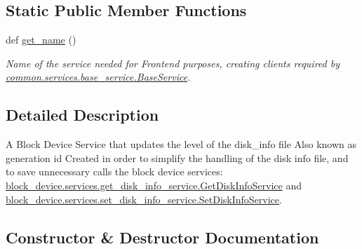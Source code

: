 \subsection*{Static Public Member Functions}
\begin{DoxyCompactItemize}
\item 
def \hyperlink{class_r_a_i_d5_1_1block__device_1_1services_1_1update__level__service_1_1_update_level_service_a3b15a64a007c7091c62be54243ddf44a}{get\+\_\+name} ()
\begin{DoxyCompactList}\small\item\em Name of the service needed for Frontend purposes, creating clients required by \hyperlink{class_r_a_i_d5_1_1common_1_1services_1_1base__service_1_1_base_service}{common.\+services.\+base\+\_\+service.\+Base\+Service}. \end{DoxyCompactList}\end{DoxyCompactItemize}


\subsection{Detailed Description}
A Block Device Service that updates the level of the disk\+\_\+info file Also known as generation id Created in order to simplify the handling of the disk info file, and to save unnecessary calls the block device services\+: \hyperlink{class_r_a_i_d5_1_1block__device_1_1services_1_1get__disk__info__service_1_1_get_disk_info_service}{block\+\_\+device.\+services.\+get\+\_\+disk\+\_\+info\+\_\+service.\+Get\+Disk\+Info\+Service} and \hyperlink{class_r_a_i_d5_1_1block__device_1_1services_1_1set__disk__info__service_1_1_set_disk_info_service}{block\+\_\+device.\+services.\+set\+\_\+disk\+\_\+info\+\_\+service.\+Set\+Disk\+Info\+Service}. 

\subsection{Constructor \& Destructor Documentation}
\mbox{\label{class_r_a_i_d5_1_1block__device_1_1services_1_1update__level__service_1_1_update_level_service_a09441a50f9cb4c0f0c84918430f60aec}} 
